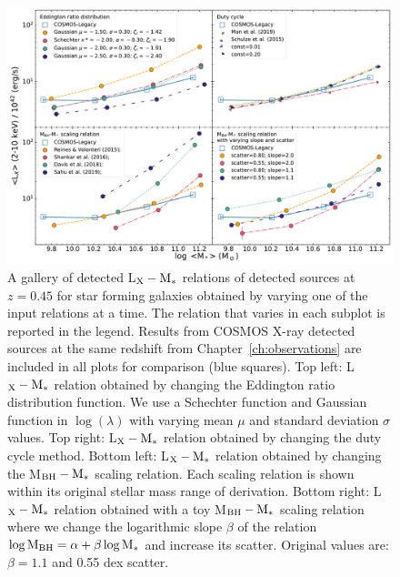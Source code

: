 \begin{figure}
\begin{center}
  \includegraphics[width=\textwidth]{Figs/Chapter3/fig2_active_z0.45_Uconst02.pdf}
  \caption{A gallery of detected L$_{\rm X}-{\rm M}_*$ relations of detected sources at
  $z=0.45$ for star forming galaxies obtained by varying one of the input relations at a time.
  The relation that varies in each subplot is reported in the legend. 
  Results from COSMOS X-ray detected sources at the same redshift from
  Chapter~\ref{ch:observations} are included in all plots for comparison (blue squares).
  Top left: L$_{\rm X}-{\rm M}_*$ relation obtained by changing the Eddington ratio distribution function. We use a Schechter function and Gaussian function in $\log(\lambda)$ with varying mean $\mu$ and standard deviation $\sigma$ values.
  Top right: L$_{\rm X}-{\rm M}_*$ relation obtained by changing the duty cycle method.
  Bottom left: L$_{\rm X}-{\rm M}_*$ relation obtained by changing the M$_{\rm BH}-{\rm M}_*$ scaling relation. Each scaling relation is shown within its original stellar mass range of derivation.
  Bottom right: L$_{\rm X}-{\rm M}_*$ relation obtained with a toy M$_{\rm BH}-{\rm M}_*$ scaling relation where we change the logarithmic slope $\beta$ of the relation $\log {\rm M}_{\rm BH} = \alpha + \beta \log {\rm M}_*$ and increase its scatter. Original \citet{2015ApJ...813...82R} values are: $\beta=1.1$ and 0.55 dex scatter.
  }
    \label{fig:LX_M}
\end{center}
\end{figure}
